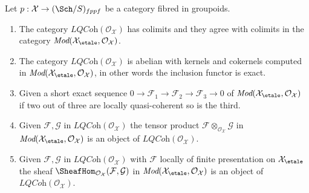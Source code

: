\begin{lemma}
\label{lemma-lqc-colimits}
Let $p : \mathcal{X} \to (\Sch/S)_{fppf}$ be a category fibred in
groupoids.
\begin{enumerate}
\item The category $\textit{LQCoh}(\mathcal{O}_\mathcal{X})$
has colimits and they agree with colimits in the category
$\textit{Mod}(\mathcal{X}_\etale, \mathcal{O}_\mathcal{X})$.
\item The category $\textit{LQCoh}(\mathcal{O}_\mathcal{X})$
is abelian with kernels and cokernels computed in
$\textit{Mod}(\mathcal{X}_\etale, \mathcal{O}_\mathcal{X})$,
in other words the inclusion functor is exact.
\item Given a short exact sequence
$0 \to \mathcal{F}_1 \to \mathcal{F}_2 \to \mathcal{F}_3 \to 0$ of
$\textit{Mod}(\mathcal{X}_\etale, \mathcal{O}_\mathcal{X})$
if two out of three are locally quasi-coherent so is the third.
\item Given $\mathcal{F}, \mathcal{G}$ in
$\textit{LQCoh}(\mathcal{O}_\mathcal{X})$
the tensor product $\mathcal{F} \otimes_{\mathcal{O}_\mathcal{X}} \mathcal{G}$
in $\textit{Mod}(\mathcal{X}_\etale, \mathcal{O}_\mathcal{X})$
is an object of $\textit{LQCoh}(\mathcal{O}_\mathcal{X})$.
\item Given $\mathcal{F}, \mathcal{G}$ in
$\textit{LQCoh}(\mathcal{O}_\mathcal{X})$
with $\mathcal{F}$ locally of finite presentation on
$\mathcal{X}_\etale$ the sheaf
$\SheafHom_{\mathcal{O}_\mathcal{X}}(\mathcal{F}, \mathcal{G})$
in $\textit{Mod}(\mathcal{X}_\etale, \mathcal{O}_\mathcal{X})$
is an object of $\textit{LQCoh}(\mathcal{O}_\mathcal{X})$.
\end{enumerate}
\end{lemma}

